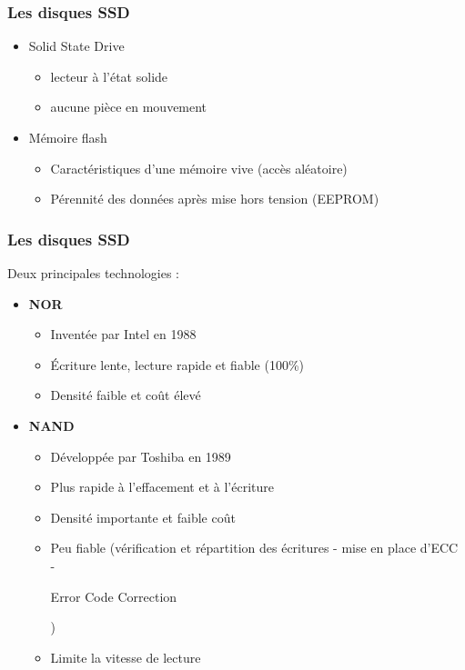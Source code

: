 \begin{frame}
\frametitle{Les disques SSD}
\begin{itemize}
\item Solid State Drive
\begin{itemize}
\item lecteur à l'état solide
\item aucune pièce en mouvement
\end{itemize}


\item Mémoire flash
\begin{itemize}
\item Caractéristiques d'une mémoire vive (accès aléatoire)
\item Pérennité des données après mise hors tension (EEPROM)
\end{itemize}
\end{itemize}
\end{frame}


\begin{frame}
\frametitle{Les disques SSD}
Deux principales technologies :
\begin{itemize}
\item \textbf{NOR}
\begin{itemize}
\item Inventée par Intel en 1988
\item Écriture lente, lecture rapide et fiable (100\%)
\item Densité faible et coût élevé
\end{itemize}
\item \textbf{NAND}
\begin{itemize}
\item Développée par Toshiba en 1989
\item Plus rapide à l'effacement et à l'écriture
\item Densité importante et faible coût
\item Peu fiable (vérification et répartition des écritures - mise en place d'ECC -\begin{tiny} Error Code Correction\end{tiny})
\item Limite la vitesse de lecture
\end{itemize}
\end{itemize}
\end{frame}


